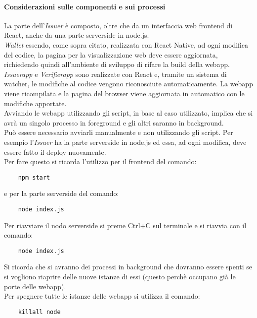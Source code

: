 \paragraph{Considerazioni sulle componenti e sui processi}
La parte dell’\textit{Issuer} è composto, oltre che da un interfaccia web frontend di React, anche da una parte serverside in node.js.\\
\textit{Wallet} essendo, come sopra citato, realizzata con React Native, ad ogni modifica del codice, la pagina per la visualizzazione web deve essere aggiornata, richiedendo quindi all'ambiente di sviluppo di rifare la build della webapp.\\
\textit{Issuerapp} e \textit{Verifierapp} sono realizzate con React e, tramite un sistema di watcher,  le modifiche al codice vengono riconosciute automaticamente. La webapp viene ricompilata e la pagina del browser viene aggiornata in automatico con le modifiche apportate.\\
Avviando le webapp utilizzando gli script, in base al caso utilizzato, implica che si avrà un singolo processo in foreground e gli altri saranno in background.\\
Può essere necessario avviarli manualmente e non utilizzando gli script. Per esempio l’\textit{Issuer} ha la parte serverside in node.js ed essa, ad ogni modifica, deve essere fatto il deploy nuovamente.\\ 
Per fare questo si ricorda l’utilizzo per il frontend del comando:
\begin{verbatim}
    npm start 
\end{verbatim}
e per la parte serverside del comando: 
\begin{verbatim}
    node index.js 
\end{verbatim}  
Per riavviare il nodo serverside si preme Ctrl+C sul terminale e si riavvia con il comando: 
\begin{verbatim}
    node index.js
\end{verbatim}
Si ricorda che si avranno dei processi in background che dovranno essere spenti se si vogliono riaprire delle nuove istanze di essi (questo perchè occupano già le porte delle webapp).\\
Per spegnere tutte le istanze delle webapp si utilizza il comando:
\begin{verbatim}
    killall node
\end{verbatim}

